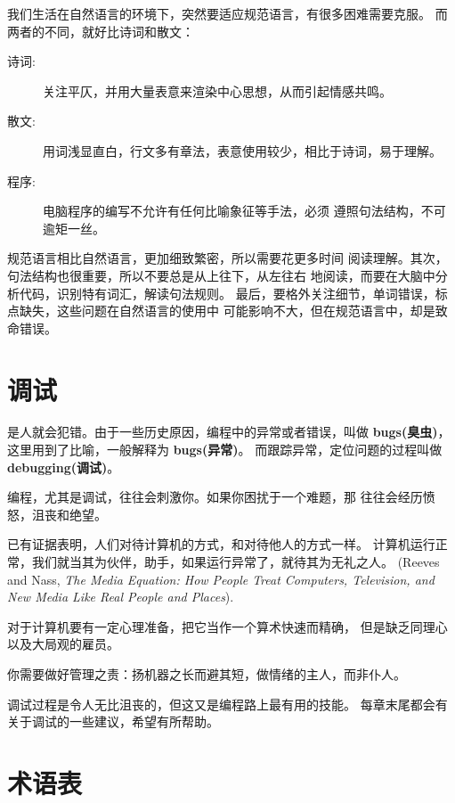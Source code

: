 \documentclass[10pt]{book}
\begin{document}
我们生活在自然语言的环境下，突然要适应规范语言，有很多困难需要克服。
而两者的不同，就好比诗词和散文：  

\begin{description}

\item[诗词:] 关注平仄，并用大量表意来渲染中心思想，从而引起情感共鸣。

\item[散文:] 用词浅显直白，行文多有章法，表意使用较少，相比于诗词，易于理解。

\item[程序:] 电脑程序的编写不允许有任何比喻象征等手法，必须
遵照句法结构，不可逾矩一丝。


\end{description}

规范语言相比自然语言，更加细致繁密，所以需要花更多时间
阅读理解。其次，句法结构也很重要，所以不要总是从上往下，从左往右
地阅读，而要在大脑中分析代码，识别特有词汇，解读句法规则。
最后，要格外关注细节，单词错误，标点缺失，这些问题在自然语言的使用中
可能影响不大，但在规范语言中，却是致命错误。

\section{调试}

是人就会犯错。由于一些历史原因，编程中的异常或者错误，叫做 {\bf bugs(臭虫)}，
这里用到了比喻，一般解释为 {\bf bugs(异常)}。
而跟踪异常，定位问题的过程叫做 {\bf debugging(调试)}。

编程，尤其是调试，往往会刺激你。如果你困扰于一个难题，那
往往会经历愤怒，沮丧和绝望。

已有证据表明，人们对待计算机的方式，和对待他人的方式一样。
计算机运行正常，我们就当其为伙伴，助手，如果运行异常了，就待其为无礼之人。
 (Reeves and Nass, {\it The Media
    Equation: How People Treat Computers, Television, and New Media
    Like Real People and Places}).

对于计算机要有一定心理准备，把它当作一个算术快速而精确，
但是缺乏同理心以及大局观的雇员。

你需要做好管理之责：扬机器之长而避其短，做情绪的主人，而非仆人。

调试过程是令人无比沮丧的，但这又是编程路上最有用的技能。
每章末尾都会有关于调试的一些建议，希望有所帮助。


\section{术语表}
\end{document}
